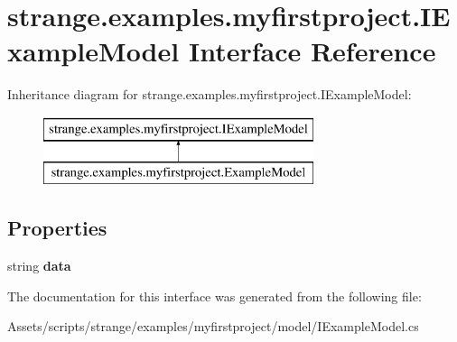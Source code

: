 \hypertarget{interfacestrange_1_1examples_1_1myfirstproject_1_1_i_example_model}{\section{strange.\-examples.\-myfirstproject.\-I\-Example\-Model Interface Reference}
\label{interfacestrange_1_1examples_1_1myfirstproject_1_1_i_example_model}
}
Inheritance diagram for strange.\-examples.\-myfirstproject.\-I\-Example\-Model\-:\begin{figure}[H]
\begin{center}
\leavevmode
\includegraphics[height=2.000000cm]{interfacestrange_1_1examples_1_1myfirstproject_1_1_i_example_model}
\end{center}
\end{figure}
\subsection*{Properties}
\begin{DoxyCompactItemize}
\item 
\hypertarget{interfacestrange_1_1examples_1_1myfirstproject_1_1_i_example_model_ac8dfcd339ff6d3cfb951e0293ab8a324}{string {\bfseries data}}\label{interfacestrange_1_1examples_1_1myfirstproject_1_1_i_example_model_ac8dfcd339ff6d3cfb951e0293ab8a324}

\end{DoxyCompactItemize}


The documentation for this interface was generated from the following file\-:\begin{DoxyCompactItemize}
\item 
Assets/scripts/strange/examples/myfirstproject/model/I\-Example\-Model.\-cs\end{DoxyCompactItemize}
